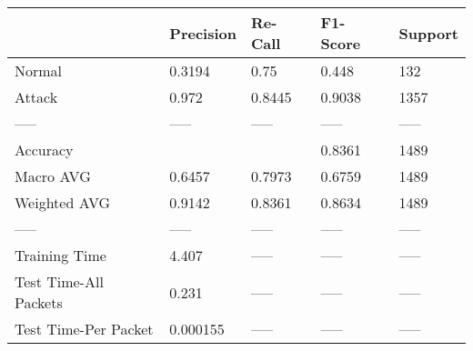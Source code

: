 \begin{tabular}{lllll}
\toprule
{} & Precision & Re-Call & F1-Score & Support \\
\midrule
Normal                &    0.3194 &    0.75 &    0.448 &     132 \\
Attack                &     0.972 &  0.8445 &   0.9038 &    1357 \\
-----                 &     ----- &   ----- &    ----- &   ----- \\
Accuracy              &           &         &   0.8361 &    1489 \\
Macro AVG             &    0.6457 &  0.7973 &   0.6759 &    1489 \\
Weighted AVG          &    0.9142 &  0.8361 &   0.8634 &    1489 \\
-----                 &     ----- &   ----- &    ----- &   ----- \\
Training Time         &     4.407 &   ----- &    ----- &   ----- \\
Test Time-All Packets &     0.231 &   ----- &    ----- &   ----- \\
Test Time-Per Packet  &  0.000155 &   ----- &    ----- &   ----- \\
\bottomrule
\end{tabular}
